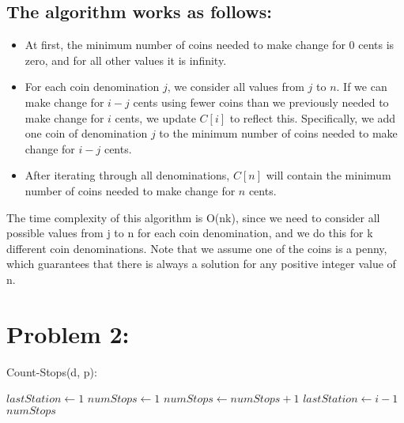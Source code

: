 \documentclass[fleqn,10pt]{olplainarticle}
\begin{document}
\subsection*{The algorithm works as follows:\newline }

\begin{itemize}
\item At first, the minimum number of coins needed to make change for 0 cents is zero, and for all other values it is infinity.
\item For each coin denomination $j$, we consider all values from $j$ to $n$. If we can make change for $i-j$ cents using fewer coins than we previously needed to make change for $i$ cents, we update $C[i]$ to reflect this. Specifically, we add one coin of denomination $j$ to the minimum number of coins needed to make change for $i-j$ cents.
\item After iterating through all denominations, $C[n]$ will contain the minimum number of coins needed to make change for $n$ cents.
\end{itemize}


The time complexity of this algorithm is O(nk), since we need to consider all possible values from j to n for each coin denomination, and we do this for k different coin denominations.
Note that we assume one of the coins is a penny, which guarantees that there is always a solution for any positive integer value of n.

\section*{Problem 2:}

\begin{algorithm}
    \caption{Count-Stops(d, p):}
    \begin{algorithmic}[1]
        \State $lastStation \gets 1$
        \State $numStops \gets 1$
                \State $numStops \gets numStops + 1$
                \State $lastStation \gets i - 1$
            \EndIf
        \EndFor
        \State \Return $numStops$
    \end{algorithmic}
\end{algorithm}
\end{document}
